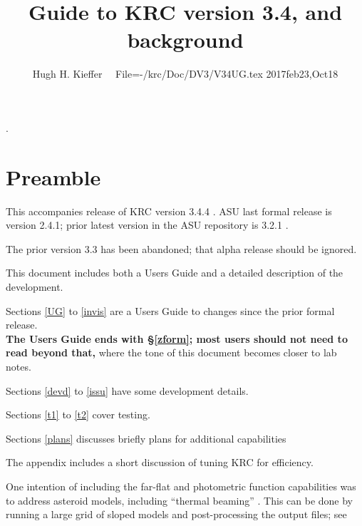 \documentclass{article}
\title{Guide to KRC version 3.4, and background }
\author{Hugh H. Kieffer  \ \ File=-/krc/Doc/DV3/V34UG.tex  2017feb23,Oct18}
\begin{document}
\maketitle
\tableofcontents
\listoffigures
\hrulefill .\hrulefill

\section{Preamble}
This accompanies release of KRC version 3.4.4 . ASU last formal
release is version 2.4.1; prior latest version in the ASU repository is 3.2.1 .

The prior version 3.3 has been abandoned; that alpha release should be ignored.

This document includes both a Users Guide and a detailed description of the development.

Sections \ref{UG} to \ref{invis} are a Users Guide to changes since the prior formal release.
\\ \textbf{ The Users Guide ends with  \S \ref{zform}; most users should not need to read beyond that,} where the tone of this document becomes closer to lab notes.  

Sections \ref{devd} to \ref{issu} have some development details.
 
Sections \ref{t1} to \ref{t2} cover testing.

Sections \ref{plans} discusses briefly plans for additional capabilities

The appendix includes a short discussion of tuning KRC for efficiency. 

One intention of including the far-flat and photometric function capabilities was
to address asteroid models, including ``thermal beaming'' . This can be done by
running a large grid of sloped models and post-processing the output files; see
 
\end{document}
